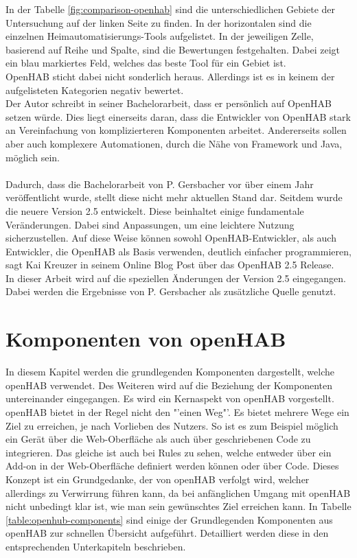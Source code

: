 In der Tabelle \ref{fig:comparison-openhab} sind die unterschiedlichen Gebiete der Untersuchung auf der linken Seite zu finden. In der horizontalen sind die einzelnen Heimautomatisierungs-Tools aufgelistet. In der jeweiligen Zelle, basierend auf Reihe und Spalte, sind die Bewertungen festgehalten. Dabei zeigt ein blau markiertes Feld, welches das beste Tool für ein Gebiet ist.\\
OpenHAB sticht dabei nicht sonderlich heraus. Allerdings ist es in keinem der aufgelisteten Kategorien negativ bewertet.\\
Der Autor schreibt in seiner Bachelorarbeit, dass er persönlich auf OpenHAB setzen würde. Dies liegt einerseits daran, dass die Entwickler von OpenHAB stark an Vereinfachung von komplizierteren Komponenten arbeitet. Andererseits sollen aber auch komplexere Automationen, durch die Nähe von Framework und Java, möglich sein.\cite{BA01:OPH}
\\
\\
Dadurch, dass die Bachelorarbeit von P. Gersbacher vor über einem Jahr veröffentlicht wurde, stellt diese nicht mehr aktuellen Stand dar. Seitdem wurde die neuere Version 2.5 entwickelt. Diese beinhaltet einige fundamentale Veränderungen. Dabei sind Anpassungen, um eine leichtere Nutzung sicherzustellen. Auf diese Weise können sowohl OpenHAB-Entwickler, als auch Entwickler, die OpenHAB als Basis verwenden, deutlich einfacher programmieren, sagt Kai Kreuzer in seinem Online Blog Post über das OpenHAB 2.5 Release.\cite{OPENHAB02:OH}\\
In dieser Arbeit wird auf die speziellen Änderungen der Version 2.5 eingegangen. Dabei werden die Ergebnisse von P. Gersbacher als zusätzliche Quelle genutzt.


\section{Komponenten von openHAB}\label{sec:technischeSicht}
In diesem Kapitel werden die grundlegenden Komponenten dargestellt, welche openHAB verwendet. Des Weiteren wird auf die  Beziehung der Komponenten untereinander eingegangen.
Es wird ein Kernaspekt von openHAB vorgestellt. openHAB bietet in der Regel nicht den "'einen Weg"'. Es bietet mehrere Wege ein Ziel zu erreichen, je nach Vorlieben des Nutzers. So ist es zum Beispiel möglich ein Gerät über die Web-Oberfläche als auch über geschriebenen Code zu integrieren. Das gleiche ist auch bei Rules zu sehen, welche entweder über ein Add-on in der Web-Oberfläche definiert werden können oder über Code. Dieses Konzept ist ein Grundgedanke, der von openHAB verfolgt wird, welcher allerdings zu Verwirrung führen kann, da bei anfänglichen Umgang mit openHAB nicht unbedingt klar ist, wie man sein gewünschtes Ziel erreichen kann.
In Tabelle \ref{table:openhub-components} sind einige der Grundlegenden Komponenten aus openHAB zur schnellen Übersicht aufgeführt. Detailliert werden diese in den entsprechenden Unterkapiteln beschrieben.

